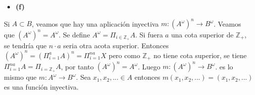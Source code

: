 \documentclass{article}
\begin{document}
\begin{itemize}
\item \bf (f) \rm
\end{itemize}
Si $A\subset B$, veamos que hay una aplicación inyectiva $m:\left(A^{\omega}\right)^n\rightarrow B^{\omega}$. Veamos que $\left(A^{\omega}\right)^n=A^{\omega}$. Se define $A^{\omega}=\Pi_{i\in \mathbb{Z}_{+}}A$. Si fuera $a$ una cota superior de $\mathbb{Z}_{+}$, se tendría que $n\cdot a$ seria otra acota superior. Entonces $\left(A^{\omega}\right)^n=\left(\Pi^a_{i=1}A\right)^n=\Pi^{na}_{i=1}X$ pero como $\mathbb{Z}_{+}$ no tiene cota superior, se tiene  $\Pi^{na}_{i=1}A=\Pi_{i=\mathbb{Z}_{+}}A$, por tanto $\left(A^{\omega}\right)^n=A^{\omega}$. Luego $m:\left(A^{\omega}\right)^n\rightarrow B^{\omega}$. es lo mismo que $m:A^{\omega}\rightarrow B^{\omega}$. Sea $x_1,x_2,...\in A$ entonces $m(x_1,x_2,...)=(x_1,x_2,...)$ es  una función inyectiva.
\end{document}
